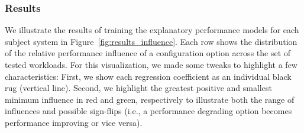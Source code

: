 {\subsubsection{Results}\label{sec:results2}
We illustrate the results of training the explanatory performance models for each subject system in Figure~\ref{fig:results_influence}. Each row shows the distribution of the relative performance influence of a configuration option across the set of tested workloads. For this visualization, we made some tweaks to highlight a few characteristics: First, we show each regression coefficient as an individual black rug (vertical line). Second, we highlight the greatest positive and smallest minimum influence in red and green, respectively to illustrate both the range of influences and possible {\color{red}sign-flips} (i.e., a performance degrading option becomes performance improving or vice versa). 

}
